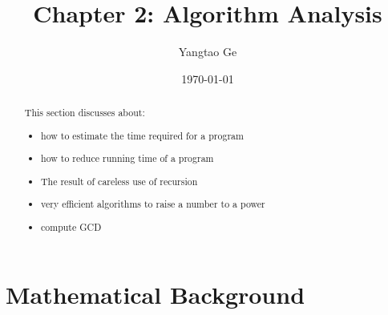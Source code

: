 \documentclass[12pt]{article}
\title{Chapter 2: Algorithm Analysis}
\author{Yangtao Ge}
\date{\today}
\theoremstyle{definition}
\begin{document}
\maketitle
\begin{abstract}
This section discusses about:
\begin{itemize}
    \item how to estimate the time required for a program
    \item how to reduce running time of a program
    \item The result of careless use of recursion
    \item very efficient algorithms to raise a number to a power
    \item compute GCD
\end{itemize}
\end{abstract}
\section{Mathematical Background}
\end{document}
